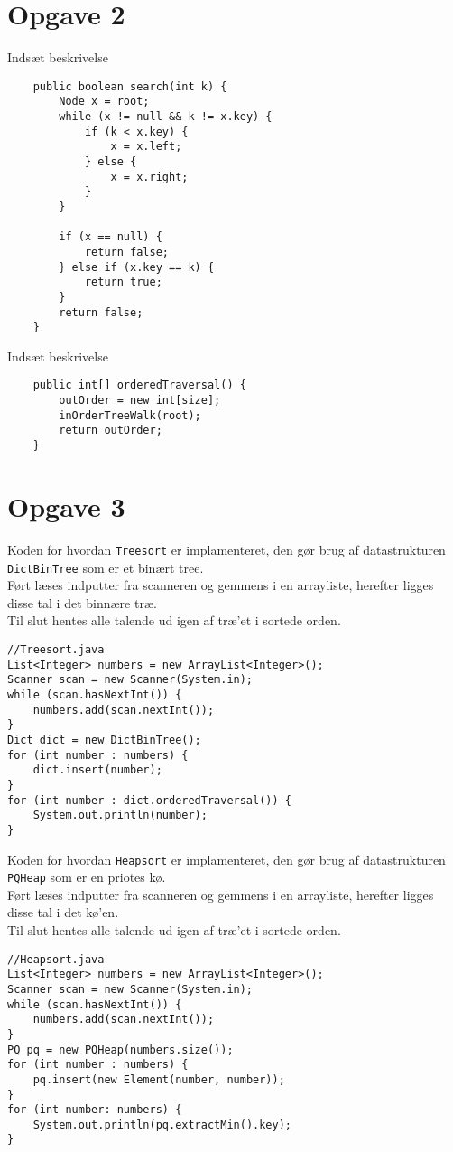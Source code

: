 \documentclass{article}
\begin{document}
\section*{Opgave 2}
Indsæt beskrivelse
\begin{lstlisting}
	public boolean search(int k) {
        Node x = root;
        while (x != null && k != x.key) {
            if (k < x.key) {
                x = x.left;
            } else {
                x = x.right;
            }
        }

        if (x == null) {
            return false;
        } else if (x.key == k) {
            return true;
        }
        return false;
    }
\end{lstlisting}
Indsæt beskrivelse
\begin{lstlisting}
	public int[] orderedTraversal() {
        outOrder = new int[size];
        inOrderTreeWalk(root);
        return outOrder;
    }
\end{lstlisting}
\newpage
\section*{Opgave 3}
Koden for hvordan \texttt{Treesort} er implamenteret, den gør brug af datastrukturen \texttt{DictBinTree} som er et binært tree.\\
Ført læses indputter fra scanneren og gemmens i en arrayliste, herefter ligges disse tal i det binnære træ.\\
Til slut hentes alle talende ud igen af træ'et i sortede orden.
\begin{lstlisting}
//Treesort.java
List<Integer> numbers = new ArrayList<Integer>();
Scanner scan = new Scanner(System.in);
while (scan.hasNextInt()) {
	numbers.add(scan.nextInt());
}
Dict dict = new DictBinTree();
for (int number : numbers) {
	dict.insert(number);
}
for (int number : dict.orderedTraversal()) {
	System.out.println(number);
}
\end{lstlisting}
Koden for hvordan \texttt{Heapsort} er implamenteret, den gør brug af datastrukturen \texttt{PQHeap} som er en priotes kø.\\
Ført læses indputter fra scanneren og gemmens i en arrayliste, herefter ligges disse tal i det kø'en.\\
Til slut hentes alle talende ud igen af træ'et i sortede orden.
\begin{lstlisting}
//Heapsort.java
List<Integer> numbers = new ArrayList<Integer>();
Scanner scan = new Scanner(System.in);
while (scan.hasNextInt()) {
	numbers.add(scan.nextInt());
}
PQ pq = new PQHeap(numbers.size());
for (int number : numbers) {
	pq.insert(new Element(number, number));
}
for (int number: numbers) {
	System.out.println(pq.extractMin().key);
}
\end{lstlisting}
\newpage
\end{document}

